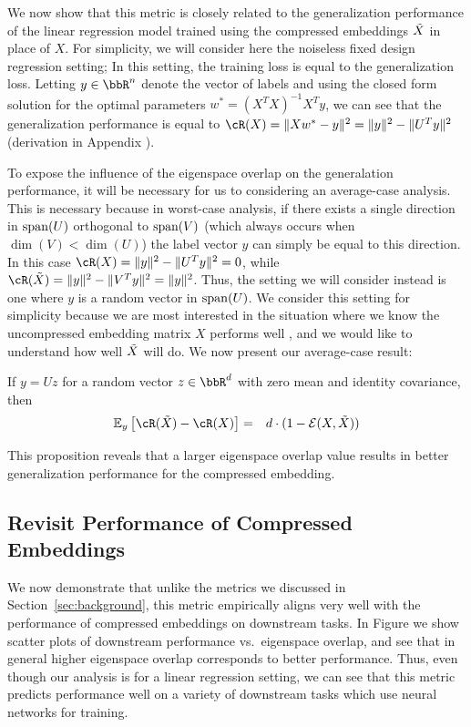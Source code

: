 We now show that this metric is closely related to the generalization performance of the linear regression model trained using the compressed embeddings $\tX$ in place of $X$.
For simplicity, we will consider here the noiseless fixed design regression setting;
In this setting, the training loss is equal to the generalization loss.
Letting $y\in\RR^n$ denote the vector of labels and using the closed form solution for the optimal parameters $w^* = (X^T X)^{-1}X^Ty$, we can see that the generalization performance is equal to $\cR(X) = \|Xw^* - y\|^2 = \|y\|^2 - \|U^T y\|^2$ (derivation in Appendix ).

To expose the influence of the eigenspace overlap on the generalation performance, it will be necessary for us to considering an average-case analysis.
This is necessary because in worst-case analysis, if there exists a single direction in $\Span(U)$ orthogonal to $\Span(V)$ (which always occurs when $\dim(V) < \dim(U)$) the label vector $y$ can simply be equal to this direction.
In this case $\cR(X) = \|y\|^2 - \|U^T y\|^2 = 0$, while $\cR(\tX) = \|y\|^2 - \|V^T y\|^2 = \|y\|^2$.
Thus, the setting we will consider instead is one where $y$ is a random vector in $\Span(U)$.
We consider this setting for simplicity because we are most interested in the situation where we know the uncompressed embedding matrix $X$ performs well , and we would like to understand how well $\tX$ will do.
We now present our average-case result:

\begin{proposition}
If $y = Uz$ for a random vector $z \in \RR^d$ with zero mean and identity covariance, then
\begin{eqnarray}
\expect{y}{\cR(\tX) - \cR(X)} &=& d\cdot(1 - \eigover(X,\tX))
\end{eqnarray}
\end{proposition}

This proposition reveals that a larger eigenspace overlap value results in better generalization performance for the compressed embedding.

\subsection{Revisit Performance of Compressed Embeddings}
\label{subsec:revisit}
We now demonstrate that unlike the metrics we discussed in Section~\ref{sec:background}, this metric empirically aligns very well with the performance of compressed embeddings on downstream tasks.
In Figure  we show scatter plots of downstream performance vs.\ eigenspace overlap, and see that in general higher eigenspace overlap corresponds to better performance.
Thus, even though our analysis is for a linear regression setting, we can see that this metric predicts performance well on a variety of downstream tasks which use neural networks for training.

